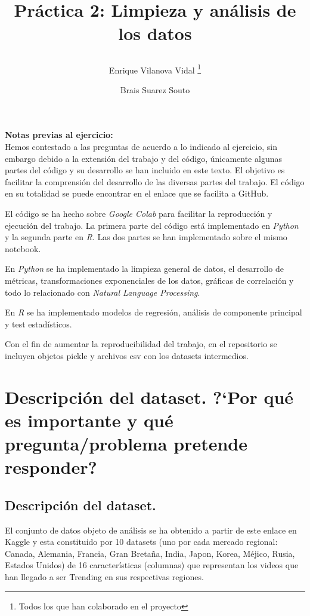 \documentclass[a4paper,12pt]{article}
\title{%

Pr\'actica 2: Limpieza y an\'alisis de los datos
	
	\author{%
	Enrique Vilanova Vidal%
		\thanks{Todos los que han colaborado en el proyecto}
	\and Brais Suarez Souto
	}
}
\begin{document}
\maketitle
\thispagestyle{empty}
\clearpage
{} 
\newpage

\textbf{Notas previas al ejercicio:} \\

Hemos contestado a las preguntas de acuerdo a lo indicado al ejercicio, sin embargo debido a la extensi\'on del trabajo y del c\'odigo, \'unicamente algunas partes del c\'odigo y su desarrollo  se han incluido en este texto. El objetivo es facilitar la comprensi\'on del desarrollo de las diversas partes del trabajo. El c\'odigo en su totalidad se puede encontrar en el enlace que se facilita a GitHub.

El c\'odigo se ha hecho sobre {\itshape Google Colab} para facilitar la reproducci\'on y ejecuci\'on del trabajo. La primera parte del c\'odigo est\'a implementado en {\itshape Python} y la segunda parte en {\itshape R}. Las dos partes se han implementado sobre el mismo notebook.

En {\itshape Python} se ha implementado la limpieza general de datos, el desarrollo de m\'etricas, transformaciones exponenciales de los datos, gr\'aficas de correlaci\'on y todo lo relacionado con {\itshape Natural Language Processing}.

En {\itshape R} se ha implementado modelos de regresi\'on, an\'alisis de componente principal y test estad\'isticos.

Con el fin de aumentar la reproducibilidad del  trabajo, en el repositorio se incluyen objetos pickle y archivos csv con los datasets intermedios.

\newpage
\section[item_descripcion]{Descripci\'on del dataset. ?`Por qu\'e es importante y qu\'e  pregunta/problema pretende responder?}

\subsection{Descripci\'on del dataset.}

El conjunto de datos objeto de an\'alisis se ha obtenido a partir de este enlace en Kaggle y esta constituido por 10 datasets (uno por cada mercado regional: Canada, Alemania, Francia, Gran Breta\~na, India, Japon, Korea, M\'ejico, Rusia, Estados Unidos) de 16 caracter\'isticas (columnas) que representan los videos que han llegado a ser Trending en sus respectivas regiones.
\end{document}

